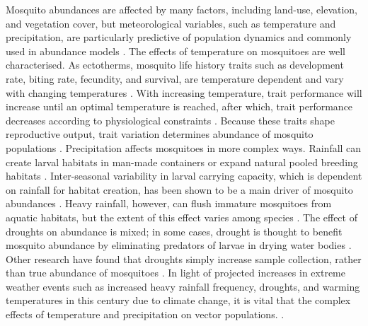 Mosquito abundances are affected by many factors, including land-use, elevation, and vegetation cover, but meteorological variables, such as temperature and precipitation, are particularly predictive of population dynamics and commonly used in abundance models \citep{Trawinski2008, Li2019, Wang2011, Yoo2016}. The effects of temperature on mosquitoes are well characterised. As ectotherms, mosquito life history traits such as development rate, biting rate, fecundity, and survival, are temperature dependent and vary with changing temperatures \citep{Mordecai2019}. With increasing temperature, trait performance will increase until an optimal temperature is reached, after which, trait performance decreases according to physiological constraints \citep{Amarasekare2012}. Because these traits shape reproductive output, trait variation determines abundance of mosquito populations \citep{Cator2020}. Precipitation affects mosquitoes in more complex ways. Rainfall can create larval habitats in man-made containers or expand natural pooled breeding habitats \citep{Keith2005, Koenraadt2008}. Inter-seasonal variability in larval carrying capacity, which is dependent on rainfall for habitat creation, has been shown to be a main driver of mosquito abundances \citep{Marini2016}. Heavy rainfall, however, can flush immature mosquitoes from aquatic habitats, but the extent of this effect varies among species \citep{Koenraadt2008, Paaijmans2007}. The effect of droughts on abundance is mixed; in some cases, drought is thought to benefit mosquito abundance by eliminating predators of larvae in drying water bodies \citep{Chase2003}. Other research have found that droughts simply increase sample collection, rather than true abundance of mosquitoes \citep{Shaman2002}. In light of projected increases in extreme weather events such as increased heavy rainfall frequency, droughts, and warming temperatures in this century due to climate change, it is vital that the complex effects of temperature and precipitation on vector populations. \citep{Seneviratne2012}.

